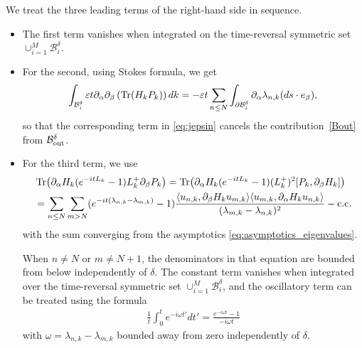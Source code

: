 \documentclass[a4paper,11pt]{article}
\theoremstyle{plain}
\theoremstyle{remark}
\def\eps{{\varepsilon}}
\begin{document}
We treat the three leading terms of the right-hand side in sequence.
\begin{itemize}
\item The first term vanishes when integrated on the time-reversal symmetric
set $\cup_{i=1}^M \mathcal B_{i}^{\delta}$.
\item For the second, using Stokes formula, we get
\begin{align*}
  \int_{\mathcal B_{i}^{\delta}} \eps t \partial_\alpha\partial_\beta \left( \Tr (H_k P_k) \right) dk = -\eps t \sum_{ n\leq N} \int_{\partial{\mathcal B}_{i}^{\delta}}\partial_\alpha \lambda_{n,k} (ds\cdot e_\beta),
\end{align*}
so that the corresponding term in \eqref{eq:jepsin} cancels the contribution~\eqref{Bout} from
$\mathcal B_{\rm out}^{\delta}$.
\item For the third term, we use
  \begin{align*}
  &  \Tr(\partial_\alpha H_k (e^{-i t L_{k}} - 1) L_{k}^{+} \partial_\beta P_k) = \Tr(\partial_\alpha H_k (e^{-i t L_{k}} - 1) (L_{k}^{+})^{2} [P_k, \partial_\beta H_k])\\
    &= \sum_{n \le N}\sum_{m > N} (e^{-i t (\lambda_{n,k} - \lambda_{m,k})} - 1)\frac{\langle u_{n,k}, \partial_\beta H_k u_{m,k} \rangle\langle u_{m,k}, \partial_\alpha H_k u_{n,k}\rangle}{(\lambda_{m,k} - \lambda_{n,k})^{2}} - \rm c.c.
  \end{align*}
  with the sum converging from the asymptotics \eqref{eq:asymptotics_eigenvalues}.

  When $n \neq N$ or $m \neq N+1$, the denominators
  in that equation are bounded from below independently of $\delta$.
  The constant term vanishes when integrated over the time-reversal
  symmetric set $\cup_{i=1}^M \mathcal B_{i}^{\delta}$, and
  the oscillatory term can be treated using the formula
  \begin{align*}
    \frac 1 t \int_{0}^{t} e^{-i\omega t'} dt' = \frac{e^{-i\omega t} - 1}{-i\omega t}
  \end{align*}
  with $\omega = \lambda_{n,k} - \lambda_{m,k}$ bounded away from zero
  independently of $\delta$.
\end{itemize}
\end{document}
